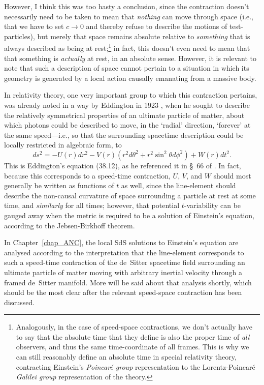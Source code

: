 However, I think this was too hasty a conclusion, since the contraction doesn't necessarily need to be taken to mean that \textit{nothing} can move through space (i.e., that we have to set $c\rightarrow0$ and thereby refuse to describe the motions of test-particles), but merely that space remains absolute relative to \textit{something} that is always described as being at rest;\footnote{Analogously, in the case of speed-space contractions, we don't actually have to say that the absolute time that they define is also the proper time of \textit{all} observers, and thus the same time-coordinate of all frames. This is why we can still reasonably define an absolute time in special relativity theory, contracting Einstein's \textit{Poincar\'{e} group} representation to the Lorentz-Poincar\'{e} \textit{Galilei group} representation of the theory.} in fact, this doesn't even need to mean that that something is \textit{actually} at rest, in an absolute sense. However, it is relevant to note that such a description of space cannot pertain to a situation in which its geometry is generated by a local action causally emanating from a massive body.

In relativity theory, one very important group to which this contraction pertains, was already noted in a way by Eddington in 1923 \cite{Eddington1923}, when he sought to describe the relatively symmetrical properties of an ultimate particle of matter, about which photons could be described to move, in the `radial' direction, `forever' at the same speed---i.e., so that the surrounding spacetime description could be locally restricted in algebraic form, to
\begin{equation}
ds^2=-U(r)dr^2-V(r)(r^2d\theta^2+r^2\sin^2\theta{d\phi}^2)+W(r)dt^2.\label{Edd_contraction_intro}
\end{equation}
This is Eddington's equation (38.12), as he referenced it in \S~66 of \cite{Eddington1923}. In fact, because this corresponds to a speed-time contraction, $U$, $V$, and $W$ should most generally be written as functions of $t$ as well, since the line-element should describe the non-causal curvature of space surrounding a particle at rest at some time, and \textit{similarly} for all times; however, that potential $t$-variability can be gauged away when the metric is required to be a solution of Einstein's equation, according to the Jebsen-Birkhoff theorem. 

In Chapter~\ref{chap_ANC}, the local SdS solutions to Einstein's equation are analysed according to the interpretation that the line-element corresponds to such a speed-time contraction of the de~Sitter spacetime field surrounding an ultimate particle of matter moving with arbitrary inertial velocity through a framed de~Sitter manifold. More will be said about that analysis shortly, which should be the most clear after the relevant speed-space contraction has been discussed.

